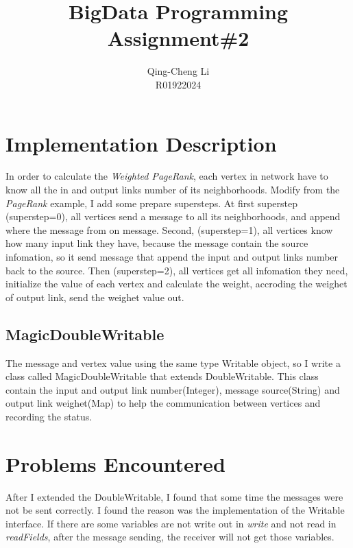 \documentclass[11pt]{article}
\title{\textbf{BigData Programming Assignment\#2}}
\author{Qing-Cheng Li\\
R01922024}
\date{}
\begin{document}
\maketitle

\section{Implementation Description}

In order to calculate the \emph{Weighted PageRank}, each vertex in network have to know all the in and output links number of its neighborhoods. Modify from the \emph{PageRank} example, I add some prepare supersteps. At first superstep (superstep=0), all vertices send a message to all its neighborhoods, and append where the message from on message. Second, (superstep=1), all vertices know how many input link they have, because the message contain the source infomation, so it send message that append the input and output links number back to the source. Then (superstep=2), all vertices get all infomation they need, initialize the value of each vertex and calculate the weight, accroding the weighet of output link, send the weighet value out.

\subsection{MagicDoubleWritable}

The message and vertex value using the same type Writable object, so I write a class called MagicDoubleWritable that extends DoubleWritable. This class contain the input and output link number(Integer), message source(String) and output link weighet(Map) to help the communication between vertices and recording the status.

\section{Problems Encountered}

After I extended the DoubleWritable, I found that some time the messages were not be sent correctly. I found the reason was the implementation of the Writable interface. If there are some variables are not write out in \emph{write} and not read in \emph{readFields}, after the message sending, the receiver will not get those variables.
\end{document}
